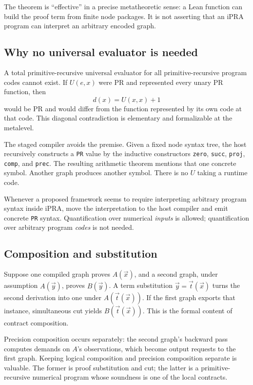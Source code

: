 The theorem is ``effective'' in a precise metatheoretic sense: a Lean function
can build the proof term from finite node packages.  It is not asserting that
an iPRA program can interpret an arbitrary encoded graph.

\subsection{Why no universal evaluator is needed}

A total primitive-recursive universal evaluator for all primitive-recursive
program codes cannot exist.  If \(U(e,x)\) were PR and represented every unary
PR function, then
\[
 d(x)=U(x,x)+1
\]
would be PR and would differ from the function represented by its own code at
that code.  This diagonal contradiction is elementary and formalizable at the
metalevel.

The staged compiler avoids the premise.  Given a fixed node syntax tree, the
host recursively constructs a \texttt{PR} value by the inductive constructors
\texttt{zero}, \texttt{succ}, \texttt{proj}, \texttt{comp}, and
\texttt{prec}.  The resulting arithmetic theorem mentions that one concrete
symbol.  Another graph produces another symbol.  There is no \(U\) taking a
runtime code.

\begin{principle}
Whenever a proposed framework seems to require interpreting arbitrary program
syntax inside iPRA, move the interpretation to the host compiler and emit
concrete \texttt{PR} syntax.  Quantification over numerical \emph{inputs} is
allowed; quantification over arbitrary program \emph{codes} is not needed.
\end{principle}

\subsection{Composition and substitution}

Suppose one compiled graph proves \(A(\vec x)\), and a second graph, under
assumption \(A(\vec y)\), proves \(B(\vec y)\).  A term substitution
\(\vec y=\vec t(\vec x)\) turns the second derivation into one under
\(A(\vec t(\vec x))\).  If the first graph exports that instance, simultaneous
cut yields \(B(\vec t(\vec x))\).  This is the formal content of contract
composition.

Precision composition occurs separately: the second graph's backward pass
computes demands on \(A\)'s observations, which become output requests to the
first graph.  Keeping logical composition and precision composition separate
is valuable.  The former is proof substitution and cut; the latter is a
primitive-recursive numerical program whose soundness is one of the local
contracts.

